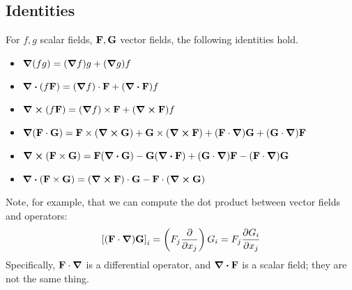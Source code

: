 \subsection{Identities}
\begin{proposition}
	For \(f, g\) scalar fields, \(\vb F, \vb G\) vector fields, the following identities hold.
	\begin{itemize}
		\item \(\grad(fg) = (\grad f)g + (\grad g)f\)
		\item \(\div(f \vb F) = (\grad f)\cdot \vb F + (\div {\vb F})f\)
		\item \(\curl(f \vb F) = (\grad f)\times \vb F + (\curl {\vb F})f\)
		\item \(\grad(\vb F \cdot \vb G) = \vb F \times (\curl{\vb G}) + \vb G \times (\curl{\vb F}) + (\vb F \cdot \grad)\vb G + (\vb G \cdot \grad)\vb F\)
		\item \(\curl(\vb F \times \vb G) = \vb F(\div{\vb G}) - \vb G(\div{\vb F}) + (\vb G \cdot \grad)\vb F - (\vb F \cdot \grad)\vb G\)
		\item \(\div(\vb F \times \vb G) = (\curl{\vb F}) \cdot \vb G - \vb F \cdot (\curl{\vb G})\)
	\end{itemize}
\end{proposition}
\noindent Note, for example, that we can compute the dot product between vector fields and operators:
\[
	\left[ (\vb F \cdot \grad) \vb G \right]_i = \left( F_j \pdv{x_j} \right) G_i = F_j \pdv{G_i}{x_j}
\]
Specifically, \(\vb F \cdot \grad\) is a differential operator, and \(\div{\vb F}\) is a scalar field; they are not the same thing.
